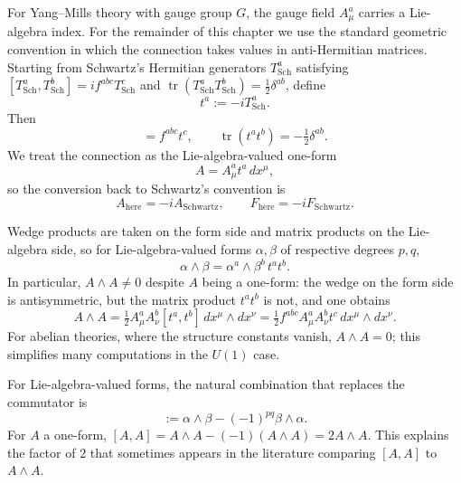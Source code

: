 \documentclass[11pt]{article}
\newcommand{\tr}{\operatorname{tr}}
\theoremstyle{definition}
\numberwithin{theorem}{section}
\numberwithin{equation}{section}
\begin{document}
For Yang--Mills theory with gauge group $G$, the gauge field $A_\mu^a$ carries a Lie-algebra index. For the remainder of this chapter we use the standard geometric convention in which the connection takes values in anti-Hermitian matrices. Starting from Schwartz's Hermitian generators $T_{\text{Sch}}^a$ satisfying $[T_{\text{Sch}}^a,T_{\text{Sch}}^b] = if^{abc}T_{\text{Sch}}^c$ and $\tr(T_{\text{Sch}}^aT_{\text{Sch}}^b)=\tfrac12\delta^{ab}$, define
\begin{equation*}
t^a := -iT_{\text{Sch}}^a.
\end{equation*}
Then
\begin{equation*}
[t^a,t^b] = f^{abc}t^c,
\qquad
\tr(t^at^b) = -\tfrac12\delta^{ab}.
\end{equation*}
We treat the connection as the Lie-algebra-valued one-form
\begin{equation}\label{eq:A-def}
A = A_\mu^a t^a\, dx^\mu,
\end{equation}
so the conversion back to Schwartz's convention is
\begin{equation*}
A_{\text{here}} = -iA_{\text{Schwartz}},
\qquad
F_{\text{here}} = -iF_{\text{Schwartz}}.
\end{equation*}

\medskip

\noindent Wedge products are taken on the form side and matrix products on the Lie-algebra side, so for Lie-algebra-valued forms $\alpha,\beta$ of respective degrees $p,q$,
\begin{equation}
\alpha \wedge \beta = \alpha^a \wedge \beta^b\, t^a t^b.
\end{equation}
In particular, $A\wedge A \neq 0$ despite $A$ being a one-form: the wedge on the form side is antisymmetric, but the matrix product $t^at^b$ is not, and one obtains
\begin{equation*}
A\wedge A = \tfrac{1}{2} A_\mu^a A_\nu^b [t^a,t^b]\, dx^\mu \wedge dx^\nu = \tfrac{1}{2}f^{abc} A_\mu^a A_\nu^b t^c\, dx^\mu\wedge dx^\nu.
\end{equation*}
For abelian theories, where the structure constants vanish, $A\wedge A = 0$; this simplifies many computations in the $U(1)$ case.

\begin{remark}
For Lie-algebra-valued forms, the natural combination that replaces the commutator is
\begin{equation*}
[\alpha,\beta] := \alpha\wedge\beta - (-1)^{pq}\beta\wedge\alpha.
\end{equation*}
For $A$ a one-form, $[A,A] = A\wedge A - (-1)(A\wedge A) = 2A\wedge A$. This explains the factor of $2$ that sometimes appears in the literature comparing $[A,A]$ to $A\wedge A$.
\end{remark}
\end{document}
